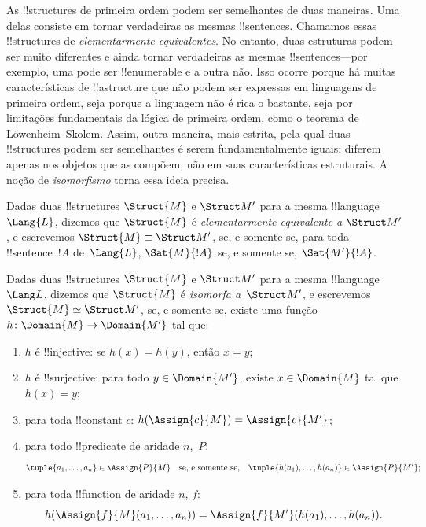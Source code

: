 \documentclass[../../../include/open-logic-section]{subfiles}
\begin{document}

As !!{structure}s de primeira ordem podem ser semelhantes de duas
maneiras. Uma delas consiste em tornar verdadeiras as mesmas
!!{sentence}s. Chamamos essas !!{structure}s de \emph{elementarmente
equivalentes}. No entanto, duas estruturas podem ser muito diferentes
e ainda tornar verdadeiras as mesmas !!{sentence}s---por exemplo, uma
pode ser !!{enumerable} e a outra não. Isso ocorre porque há muitas
características de !!a{structure} que não podem ser expressas em
linguagens de primeira ordem, seja porque a linguagem não é rica o
bastante, seja por limitações fundamentais da lógica de primeira ordem,
como o teorema de L\"owenheim--Skolem. Assim, outra maneira, mais
estrita, pela qual duas !!{structure}s podem ser semelhantes é serem
fundamentalmente iguais: diferem apenas nos objetos que as compõem, não
em suas características estruturais. A noção de \emph{isomorfismo}
torna essa ideia precisa.

\begin{defn}
Dadas duas !!{structure}s $\Struct{M}$ e $\Struct M'$ para a mesma
!!{language}~$\Lang{L}$, dizemos que $\Struct{M}$ é
\emph{elementarmente equivalente a} $\Struct M'$, e escrevemos
$\Struct{M} \equiv \Struct M'$, se, e somente se, para toda
!!{sentence}~$!A$ de~$\Lang{L}$, $\Sat{M}{!A}$ se, e somente se,
$\Sat{M'}{!A}$.
\end{defn}

\begin{defn}
 Dadas duas !!{structure}s $\Struct{M}$ e
$\Struct M'$ para a mesma !!{language}~$\Lang L$, dizemos que
$\Struct{M}$ é \emph{isomorfa a}~$\Struct M'$, e escrevemos $\Struct{M}
\simeq \Struct M'$, se, e somente se, existe uma função $h \colon
\Domain{M} \to \Domain{M'}$ tal que:
\begin{enumerate}
\item $h$ é !!{injective}: se $h(x) =
  h(y)$, então $x = y$; 
\item $h$ é !!{surjective}: para todo $y \in \Domain{M'}$, existe
  $x \in \Domain{M}$ tal que $h(x) = y$;
\item {}para toda !!{constant} $c$:
  $h(\Assign{c}{M}) = \Assign{c}{M'}$;
\item {}para todo !!{predicate} de aridade $n$,~$P$:
  \[
  \tuple{a_1, \dots, a_n}\in \Assign{P}{M} \quad\text{se, e somente se,}\quad
  \tuple{h(a_1), \dots, h(a_n)} \in \Assign{P}{M'};
  \]
\item {}para toda !!{function} de aridade $n$, $f$:
  \[
  h(\Assign{f}{M}(a_1, \dots, a_n)) =
  \Assign{f}{M'}(h(a_1), \dots, h(a_n)).
  \]
\end{enumerate}
\end{defn}
\end{document}
